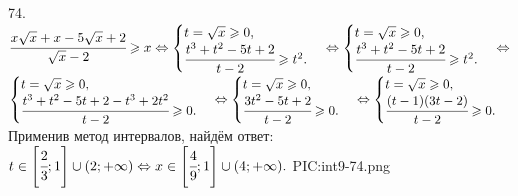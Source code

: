 74. $\cfrac{x\sqrt{x}+x-5\sqrt{x}+2}{\sqrt{x}-2}\geqslant x \Leftrightarrow \begin{cases} t=\sqrt{x}\geqslant0,\\ \cfrac{t^3+t^2-5t+2}{t-2}\geqslant t^2.\end{cases}
\Leftrightarrow \begin{cases} t=\sqrt{x}\geqslant0,\\ \cfrac{t^3+t^2-5t+2}{t-2}\geqslant t^2.\end{cases}
\Leftrightarrow$\\$ \begin{cases} t=\sqrt{x}\geqslant0,\\ \cfrac{t^3+t^2-5t+2-t^3+2t^2}{t-2}\geqslant 0.\end{cases}
\Leftrightarrow \begin{cases} t=\sqrt{x}\geqslant0,\\ \cfrac{3t^2-5t+2}{t-2}\geqslant 0.\end{cases}
\Leftrightarrow \begin{cases} t=\sqrt{x}\geqslant0,\\ \cfrac{(t-1)(3t-2)}{t-2}\geqslant 0.\end{cases}$ Применив метод интервалов, найдём ответ: $t\in\left[\cfrac{2}{3};1\right]\cup(2;+\infty)\Leftrightarrow x \in\left[\cfrac{4}{9};1\right]\cup(4;+\infty).$
{{PIC:int9-74.png}}\\
